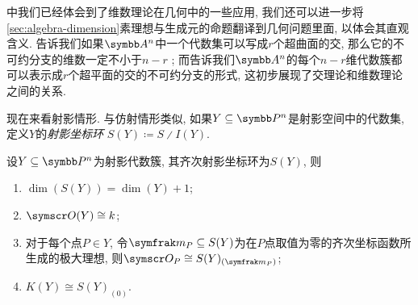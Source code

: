 中我们已经体会到了维数理论在几何中的一些应用, 我们还可以进一步将\ref{sec:algebra-dimension}素理想与生成元的命题翻译到几何问题里面, 以体会其直观含义. 告诉我们如果$\AF^n$中一个代数集可以写成$r$个超曲面的交, 那么它的不可约分支的维数一定不小于$n-r$ ; 而告诉我们$\AF^n$的每个$n-r$维代数簇都可以表示成$r$个超平面的交的不可约分支的形式, 这初步展现了交理论和维数理论之间的关系.

\bigskip

现在来看射影情形. 与仿射情形类似, 如果$Y\subseteq \PP^n$是射影空间中的代数集, 定义$Y$的\emph{射影坐标环} $S(Y)\coloneq S{\divslash}I(Y)$.

\begin{theorem}\label{thm:projectiverings}
  设$Y\subseteq\PP^n$为射影代数簇, 其齐次射影坐标环为$S(Y)$, 则
  \begin{enumerate}
    \item\label{enum:thm-projective-rings-1} $\dim (S(Y))=\dim (Y)+1$;
    \item\label{enum:thm-projective-rings-2} $\OO (Y)\cong\kk$;
    \item\label{enum:thm-projective-rings-3} 对于每个点$P\in Y$, 令$\ideal{m}_P\subseteq S(Y)$为在$P$点取值为零的齐次坐标函数所生成的极大理想, 则$\OO_P\cong S(Y)_{(\ideal{m}_P)}$;
    \item\label{enum:thm-projective-rings-4} $K(Y)\cong S(Y)_{(0)}$.
  \end{enumerate}
\end{theorem}

